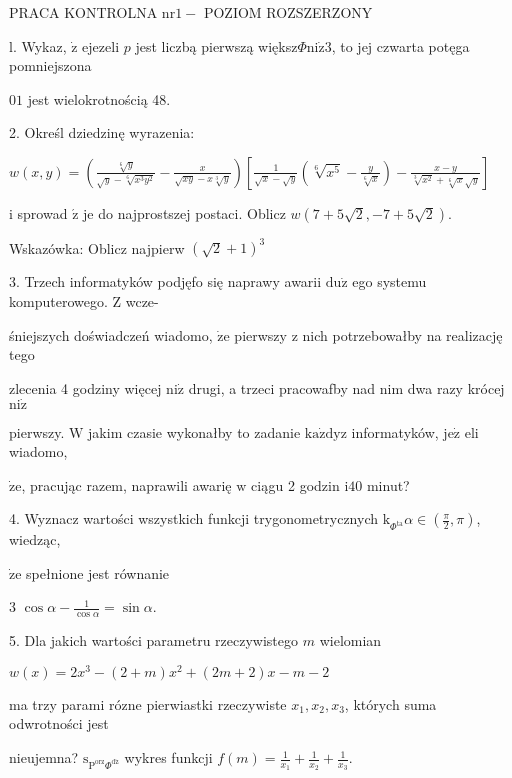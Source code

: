 \documentclass[a4paper,12pt]{article}
\begin{document}
PRACA KONTROLNA $\mathrm{n}\mathrm{r} 1 -$ POZIOM ROZSZERZONY

l. Wykaz, $\dot{\mathrm{z}}$ ejezeli $p$ jest liczbą pierwszą większ$\Phi \mathrm{n}\mathrm{i}\dot{\mathrm{z}}3$, to jej czwarta potęga pomniejszona

$01$ jest wielokrotnością 48.

2. Określ dziedzinę wyrazenia:

$w(x,y)=(\displaystyle \frac{\sqrt[6]{y}}{\sqrt{y}-\sqrt[6]{x^{3}y^{2}}}-\frac{x}{\sqrt{xy}-x\sqrt[3]{y}})[\frac{1}{\sqrt{x}-\sqrt{y}}(\sqrt[6]{x^{5}}-\frac{y}{\sqrt[6]{x}})-\frac{x-y}{\sqrt[3]{x^{2}}+\sqrt[6]{x}\sqrt{y}}]$

$\mathrm{i}$ sprowad $\acute{\mathrm{z}}$ je do najprostszej postaci. Oblicz $w(7+5\sqrt{2},-7+5\sqrt{2}).$

Wskazówka: Oblicz najpierw $(\sqrt{2}+1)^{3}$

3. Trzech informatyków podjęfo się naprawy awarii $\mathrm{d}\mathrm{u}\dot{\mathrm{z}}$ ego systemu komputerowego. $\mathrm{Z}$ wcze-

śniejszych doświadczeń wiadomo, $\dot{\mathrm{z}}\mathrm{e}$ pierwszy $\mathrm{z}$ nich potrzebowałby na realizację tego

zlecenia 4 godziny więcej $\mathrm{n}\mathrm{i}\dot{\mathrm{z}}$ drugi, a trzeci pracowafby nad nim dwa razy krócej $\mathrm{n}\mathrm{i}\dot{\mathrm{z}}$

pierwszy. $\mathrm{W}$ jakim czasie wykonałby to zadanie $\mathrm{k}\mathrm{a}\dot{\mathrm{z}}\mathrm{d}\mathrm{y}\mathrm{z}$ informatyków, $\mathrm{j}\mathrm{e}\dot{\mathrm{z}}$ eli wiadomo,

$\dot{\mathrm{z}}\mathrm{e}$, pracując razem, naprawili awarię $\mathrm{w}$ ciągu 2 godzin $\mathrm{i}40$ minut?

4. Wyznacz wartości wszystkich funkcji trygonometrycznych $\mathrm{k}_{\Phi^{\mathrm{t}\mathrm{a}}}\alpha \in (\displaystyle \frac{\pi}{2},\pi)$, wiedząc,

$\dot{\mathrm{z}}\mathrm{e}$ spełnione jest równanie

3 $\displaystyle \cos\alpha-\frac{1}{\cos\alpha}=\sin\alpha.$

5. Dla jakich wartości parametru rzeczywistego $m$ wielomian

$w(x)=2x^{3}-(2+m)x^{2}+(2m+2)x-m-2$

ma trzy parami rózne pierwiastki rzeczywiste $x_{1}, x_{2}, x_{3}$, których suma odwrotności jest

nieujemna? $\mathrm{s}_{\mathrm{P}^{\mathrm{o}\mathrm{r}\mathrm{z}}\Phi^{\mathrm{d}\acute{\mathrm{z}}}}$ wykres funkcji $f(m)=\displaystyle \frac{1}{x_{1}}+\frac{1}{x_{2}}+\frac{1}{x_{3}}.$
\end{document}
